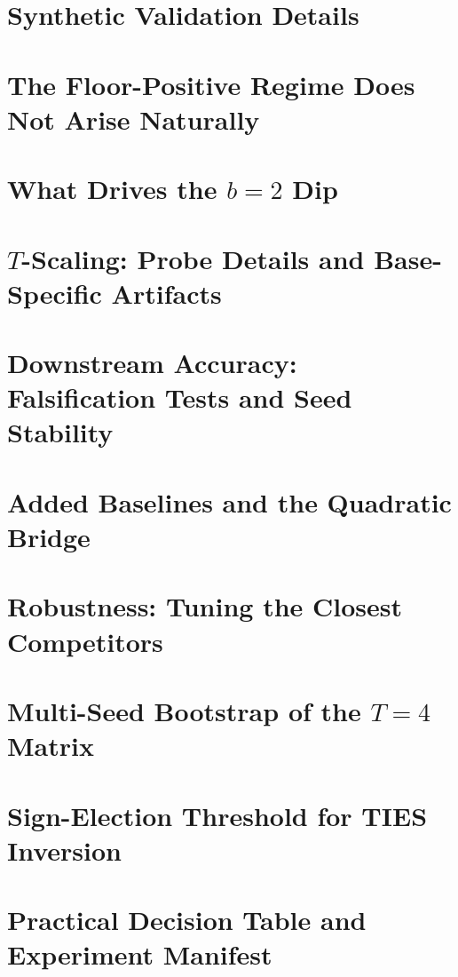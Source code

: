 \documentclass[11pt]{article}
\theoremstyle{definition}
\theoremstyle{remark}
\begin{document}



\appendix
\section{Synthetic Validation Details}\label{app:synthetic}


\section{The Floor-Positive Regime Does Not Arise Naturally}\label{app:e5}


\section{What Drives the $b=2$ Dip}\label{app:b2}


\section{$T$-Scaling: Probe Details and Base-Specific Artifacts}\label{app:tscaling}


\section{Downstream Accuracy: Falsification Tests and Seed Stability}\label{app:downstream}


\section{Added Baselines and the Quadratic Bridge}\label{app:baselines}


\section{Robustness: Tuning the Closest Competitors}\label{app:robustness}


\section{Multi-Seed Bootstrap of the $T=4$ Matrix}\label{app:multiseed}


\section{Sign-Election Threshold for TIES Inversion}\label{app:sign-election-threshold}


\section{Practical Decision Table and Experiment Manifest}\label{app:manifest}

\end{document}
